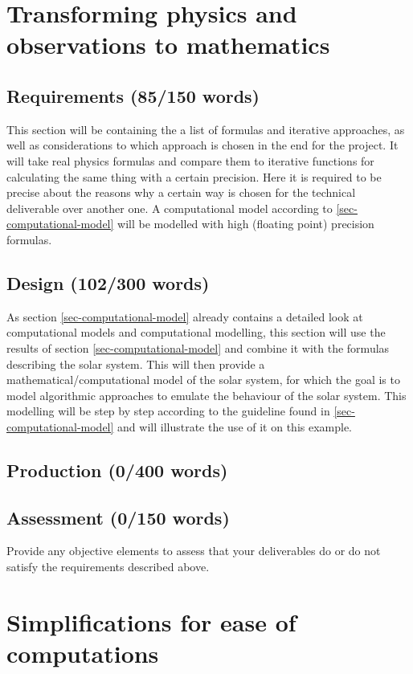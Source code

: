 \documentclass[conference,compsoc]{IEEEtran}
\begin{document}
\section{Transforming physics and observations to mathematics}
\label{sec-modeling}
\subsection{Requirements (85/150 words)}
This section will be containing the a list of formulas and iterative approaches, as well as considerations to which approach is chosen in the end for the project. It will take real physics formulas and compare them to iterative functions for calculating the same thing with a certain precision. Here it is required to be precise about the reasons why a certain way is chosen for the technical deliverable over another one. A computational model according to \ref{sec-computational-model} will be modelled with high (floating point) precision formulas.
\subsection{Design (102/300 words)}
As section \ref{sec-computational-model} already contains a detailed look at computational models and computational modelling, this section will use the results of section \ref{sec-computational-model} and combine it with the formulas describing the solar system. This will then provide a mathematical/computational model of the solar system, for which the goal is to model algorithmic approaches to emulate the behaviour of the solar system. This modelling will be step by step according to the guideline found in \ref{sec-computational-model} and will illustrate the use of it on this example.

\subsection{Production (0/400 words)}

\subsection{Assessment (0/150 words)}
Provide any objective elements to assess that your deliverables do or do not satisfy the requirements described above. 

\section{Simplifications for ease of computations}
\label{sec-simplify}
\end{document}
